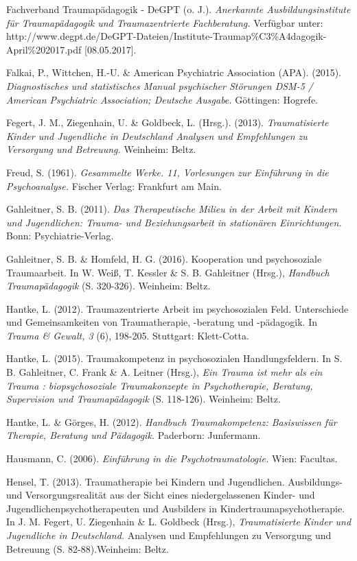 \hang
Fachverband Traumapädagogik - DeGPT (o. J.). \textit{Anerkannte Ausbildungsinstitute für Traumapädagogik und Traumazentrierte Fachberatung.} Verfügbar unter: http://www.degpt.de/DeGPT-Dateien/Institute-Traumap\%C3\%A4dagogik-April\%202017.pdf [08.05.2017].

\hang
Falkai, P., Wittchen, H.-U. \& American Psychiatric Association (APA). (2015). \textit{Diagnostisches und statistisches Manual psychischer Störungen DSM-5 / American Psychiatric Association; Deutsche Ausgabe.} G{\"o}ttingen: Hogrefe.

\hang
Fegert, J. M., Ziegenhain, U. \& Goldbeck, L. (Hrsg.). (2013). \textit{Traumatisierte Kinder und Jugendliche in Deutschland Analysen und Empfehlungen zu Versorgung und Betreuung.} Weinheim: Beltz.

\hang
Freud, S. (1961). \textit{Gesammelte Werke. 11, Vorlesungen zur Einführung in die Psychoanalyse.} Fischer Verlag: Frankfurt am Main.

\hang
Gahleitner, S. B. (2011). \textit{Das Therapeutische Milieu in der Arbeit mit Kindern und Jugendlichen: Trauma- und Beziehungsarbeit in stationären Einrichtungen.} Bonn: Psychiatrie-Verlag.

\hang
Gahleitner, S. B. \& Homfeld, H. G. (2016). Kooperation und psychosoziale Traumaarbeit. In W. Weiß, T. Kessler \& S. B. Gahleitner (Hrsg.), \textit{Handbuch Traumapädagogik} (S. 320-326). Weinheim: Beltz.

\hang
Hantke, L. (2012). Traumazentrierte Arbeit im psychosozialen Feld. Unterschiede und Gemeinsamkeiten von Traumatherapie, -beratung und -pädagogik. In \textit{Trauma \& Gewalt, 3} (6), 198-205. Stuttgart: Klett-Cotta.

\hang
Hantke, L. (2015). Traumakompetenz in psychosozialen Handlungsfeldern. In S. B. Gahleitner, C. Frank \& A. Leitner (Hrsg.), \textit{Ein Trauma ist mehr als ein Trauma : biopsychosoziale Traumakonzepte in Psychotherapie, Beratung, Supervision und Traumapädagogik} (S. 118-126). Weinheim: Beltz.

\hang
Hantke, L. \& Görges, H. (2012). \textit{Handbuch Traumakompetenz: Basiswissen für Therapie, Beratung und Pädagogik.} Paderborn: Junfermann.

\hang
Hausmann, C. (2006). \textit{Einführung in die Psychotraumatologie.} Wien: Facultas.

\hang
Hensel, T. (2013). Traumatherapie bei Kindern und Jugendlichen. Ausbildungs- und Versorgungsrealit{\"a}t aus der Sicht eines niedergelassenen Kinder- und Jugendlichenpsychotherapeuten und Ausbilders in Kindertraumapsychotherapie. In J. M. Fegert, U. Ziegenhain \& L. Goldbeck (Hrsg.), \textit{Traumatisierte Kinder und Jugendliche in Deutschland.} Analysen und Empfehlungen zu Versorgung und Betreuung (S. 82-88).Weinheim: Beltz.

